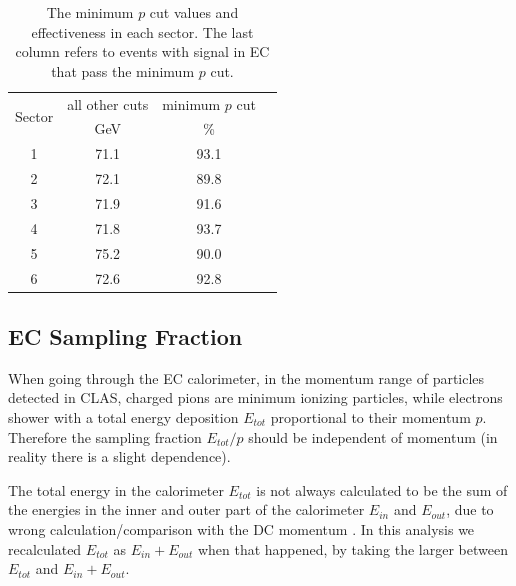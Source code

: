 \begin{table}[h]
\label{tab:pmincut}
	\begin{center}
		\begin{tabular}{c | c | c | c}
			\hline 
			\multirow{2}{*}{Sector} 
					& all other cuts & minimum $p$ cut \\
					&  GeV & \% &  \\
			\hline 
			1   & 71.1 & 93.1 \\
			2   & 72.1 & 89.8 \\
			3   & 71.9 & 91.6 \\
			4   & 71.8 & 93.7 \\
			5   & 75.2 & 90.0 \\
			6   & 72.6 & 92.8 \\
			\hline
		\end{tabular}
		\caption{The minimum $p$ cut values and effectiveness in each sector.
					The last column refers to events with signal in EC that pass the 
 					minimum $p$ cut.}	
	
	\end{center}
\end{table}

\subsection{EC Sampling Fraction}
When going through the EC calorimeter, in the momentum range of particles detected in CLAS, 
charged pions are minimum ionizing particles, while electrons shower with a total energy 
deposition $E_{tot}$ proportional to their momentum $p$. 
Therefore the sampling fraction $E_{tot}/p$ should be independent of momentum (in reality there 
is a slight dependence).

The total energy in the calorimeter $E_{tot}$ is not always calculated to be the sum of the 
energies in the inner and outer part of the calorimeter $E_{in}$ and $E_{out}$, due to wrong 
calculation/comparison with the DC momentum \cite{bib:ectotmax}. In this analysis we
recalculated $E_{tot}$ as $E_{in}+E_{out}$ when that happened, by taking the larger
between $E_{tot}$ and $E_{in}+E_{out}$.

